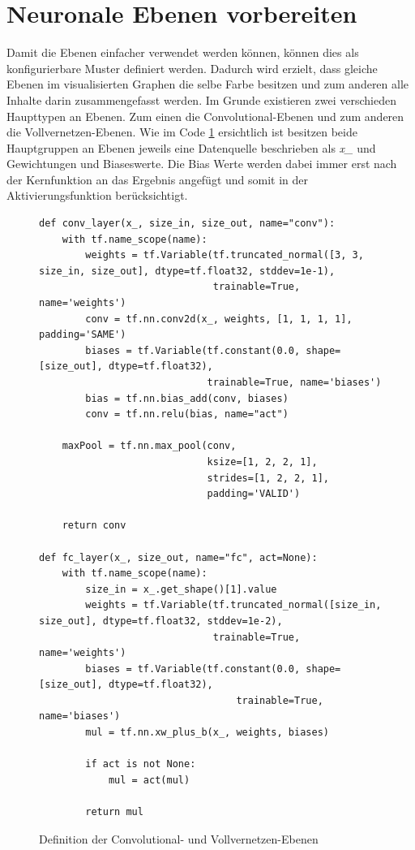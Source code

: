 \section{Neuronale Ebenen vorbereiten}

Damit die Ebenen einfacher verwendet werden können, können dies als konfigurierbare Muster definiert werden. 
Dadurch wird erzielt, dass gleiche Ebenen im visualisierten Graphen die selbe Farbe besitzen und zum anderen alle Inhalte darin zusammengefasst werden. 
Im Grunde existieren zwei verschieden Haupttypen an Ebenen. 
Zum einen die Convolutional-Ebenen und zum anderen die Vollvernetzen-Ebenen. 
Wie im Code \ref{fig:ConvFc} ersichtlich ist besitzen beide Hauptgruppen an Ebenen jeweils eine Datenquelle beschrieben als \textit{x\_} und Gewichtungen und Biaseswerte. 
Die Bias Werte werden dabei immer erst nach der Kernfunktion an das Ergebnis angefügt und somit in der Aktivierungsfunktion berücksichtigt. 
\begin{figure}[ht!]
\lstset{language=Python}
\begin{lstlisting}
def conv_layer(x_, size_in, size_out, name="conv"):
    with tf.name_scope(name):
        weights = tf.Variable(tf.truncated_normal([3, 3, size_in, size_out], dtype=tf.float32, stddev=1e-1), 
                              trainable=True, name='weights')
        conv = tf.nn.conv2d(x_, weights, [1, 1, 1, 1], padding='SAME')
        biases = tf.Variable(tf.constant(0.0, shape=[size_out], dtype=tf.float32), 
                             trainable=True, name='biases')
        bias = tf.nn.bias_add(conv, biases)
        conv = tf.nn.relu(bias, name="act")

    maxPool = tf.nn.max_pool(conv, 
                             ksize=[1, 2, 2, 1],
                             strides=[1, 2, 2, 1],
                             padding='VALID')

    return conv

def fc_layer(x_, size_out, name="fc", act=None):
    with tf.name_scope(name):
        size_in = x_.get_shape()[1].value
        weights = tf.Variable(tf.truncated_normal([size_in, size_out], dtype=tf.float32, stddev=1e-2), 
                              trainable=True, name='weights')
        biases = tf.Variable(tf.constant(0.0, shape=[size_out], dtype=tf.float32), 
                                  trainable=True, name='biases')
        mul = tf.nn.xw_plus_b(x_, weights, biases)
        
        if act is not None:
            mul = act(mul)

        return mul
\end{lstlisting}
	\caption{Definition der Convolutional- und Vollvernetzen-Ebenen}
	\label{fig:ConvFc}
\end{figure}

